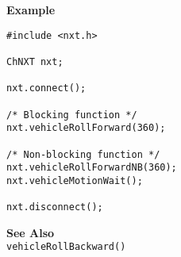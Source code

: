 \noindent
{\bf Example}
\begin{verbatim}
#include <nxt.h>

ChNXT nxt;

nxt.connect();

/* Blocking function */
nxt.vehicleRollForward(360);

/* Non-blocking function */
nxt.vehicleRollForwardNB(360);
nxt.vehicleMotionWait();

nxt.disconnect();
\end{verbatim}

\noindent
{\bf See Also}\\
\texttt{vehicleRollBackward()}

